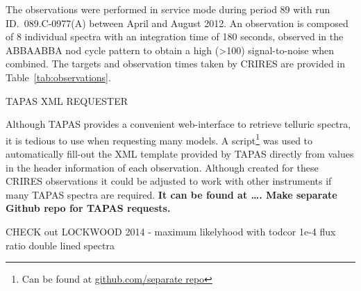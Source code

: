 The observations were performed in service mode during period 89 with run ID.~089.C-0977(A) between April and August 2012. An observation is composed of 8 individual spectra with an integration time of 180 seconds, observed in the ABBAABBA nod cycle pattern to obtain a high (>100) signal-to-noise when combined. The targets and observation times taken by CRIRES are provided in Table~\ref{tab:observations}.




TAPAS XML REQUESTER

Although TAPAS provides a convenient web-interface to retrieve telluric spectra, it is tedious to use when requesting many models. A script\footnote{Can be found at \url{github.com/separate repo}} was used to automatically fill-out the XML template provided by TAPAS directly from values in the header information of each observation. Although created for these CRIRES observations it could be adjusted to work with other instruments if many TAPAS spectra are required. \textbf{It can be found at \ldots. Make separate Github repo for TAPAS requests.}











CHECK out LOCKWOOD 2014 - maximum likelyhood with todcor   1e-4 flux ratio double lined spectra